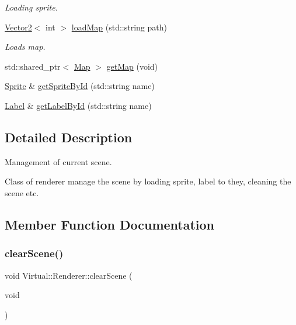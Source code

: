 \begin{DoxyCompactItemize}
\begin{DoxyCompactList}\small\item\em Loading sprite. \end{DoxyCompactList}\item 
\hyperlink{struct_virtual_1_1_vector2}{Vector2}$<$ int $>$ \hyperlink{class_virtual_1_1_renderer_a8b1576675d456d42a8b08bfb6a2d50af}{load\+Map} (std\+::string path)
\begin{DoxyCompactList}\small\item\em Loads map. \end{DoxyCompactList}\item 
std\+::shared\+\_\+ptr$<$ \hyperlink{struct_virtual_1_1_map}{Map} $>$ \hyperlink{class_virtual_1_1_renderer_aaa8e493c4e05d5eaca42604555d3b419}{get\+Map} (void)
\item 
\hyperlink{class_virtual_1_1_sprite}{Sprite} \& \hyperlink{class_virtual_1_1_renderer_ae2be5bddf056acb2c00f77fb6f0afa6c}{get\+Sprite\+By\+Id} (std\+::string name)
\item 
\hyperlink{class_virtual_1_1_label}{Label} \& \hyperlink{class_virtual_1_1_renderer_a11f3dbe70c634fb465b5b21d43618f5d}{get\+Label\+By\+Id} (std\+::string name)
\end{DoxyCompactItemize}


\subsection{Detailed Description}
Management of current scene. 

Class of renderer manage the scene by loading sprite, label to they, cleaning the scene etc. 

\subsection{Member Function Documentation}
\hypertarget{class_virtual_1_1_renderer_a2c4ba07e2388d77606f77cf10e5af0d1}{}\label{class_virtual_1_1_renderer_a2c4ba07e2388d77606f77cf10e5af0d1} 
\subsubsection{\texorpdfstring{clear\+Scene()}{clearScene()}}
{\footnotesize\ttfamily void Virtual\+::\+Renderer\+::clear\+Scene (\begin{DoxyParamCaption}\item[{void}]{ }\end{DoxyParamCaption})}



